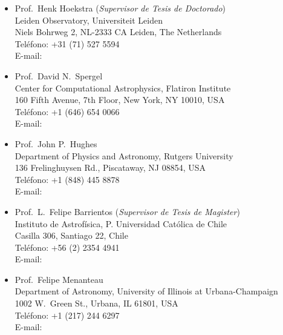 \documentclass[11pt]{article}
\begin{document}
\begin{itemize}
 \item Prof.~Henk Hoekstra (\textit{Supervisor de Tesis de Doctorado})\\
       Leiden Observatory, Universiteit Leiden\\
       Niels Bohrweg 2, NL-2333 CA Leiden, The Netherlands\\
       Tel\'efono: +31 (71) 527 5594\\
       E-mail: 
 \item Prof.~David N.~Spergel\\
       Center for Computational Astrophysics, Flatiron Institute\\
       160 Fifth Avenue, 7th Floor, New York, NY 10010, USA\\
       Tel\'efono: +1 (646) 654 0066\\
       E-mail: 
 \item Prof.~John P.~Hughes\\
       Department of Physics and Astronomy, Rutgers University\\
       136 Frelinghuysen Rd., Piscataway, NJ 08854, USA\\
       Tel\'efono: +1 (848) 445 8878\\
       E-mail: 
 \item Prof.~L.~Felipe Barrientos (\textit{Supervisor de Tesis de Magister})\\
       Instituto de Astrof\'isica, P. Universidad Cat\'olica de Chile\\
       Casilla 306, Santiago 22, Chile\\
       Tel\'efono: +56 (2) 2354 4941\\
       E-mail: 
 \item Prof.~Felipe Menanteau\\
       Department of Astronomy, University of Illinois at Urbana-Champaign\\
       1002 W.\ Green St., Urbana, IL 61801, USA\\
       Tel\'efono: +1 (217) 244 6297\\
       E-mail: 
\end{itemize}

\vspace{0.3cm}
\hline




%
\end{document}

